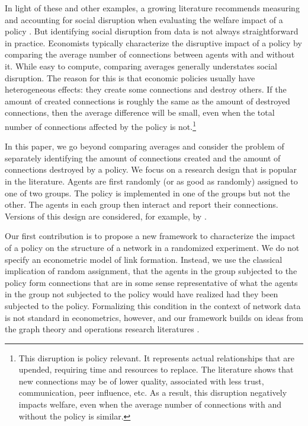 \documentclass[12pt]{article}
\theoremstyle{definition}
\begin{document}
In light of these and other examples, a growing literature recommends measuring and accounting for social disruption when evaluating the welfare impact of a policy \citep[see, for instance,][]{banerjee2021changes,jackson2021inequality}. But identifying social disruption from data is not always straightforward in practice. Economists typically characterize the disruptive impact of a policy by comparing the average number of connections between agents with and without it. While easy to compute, comparing averages generally understates social disruption. The reason for this is that economic policies usually have heterogeneous effects: they create some connections and destroy others. If the amount of created connections is roughly the same as the amount of destroyed connections, then the average difference will be small, even when the total number of connections affected by the policy is not.\footnote{This disruption is policy relevant. It represents actual relationships that are upended, requiring time and resources to replace. The literature shows that new connections may be of lower quality, associated with less trust, communication, peer influence, etc. As a result, this disruption negatively impacts welfare, even when the average number of connections with and without the policy is similar.}  


In this paper, we go beyond comparing averages and consider the problem of separately identifying the amount of connections created and the amount of connections destroyed by a policy. We focus on a research design that is popular in the literature. Agents are first randomly (or as good as randomly) assigned to one of two groups. The policy is implemented in one of the groups but not the other. The agents in each group then interact and report their connections. Versions of this design are considered, for example, by \cite{carrell2013natural,feigenberg2013economic,cai2015social,bajari2021multiple,banerjee2021changes,comola2021treatment,hess2021development,johari2022experimental}.  

Our first contribution is to propose a new framework to characterize the impact of a policy on the structure of a network in a randomized experiment. We do not specify an econometric model of link formation. Instead, we use the classical implication of random assignment, that the agents in the group subjected to the policy form connections that are in some sense representative of what the agents in the group not subjected to the policy would have realized had they been subjected to the policy. Formalizing this condition in the context of network data is not standard in econometrics, however, and our framework builds on ideas from the graph theory and operations research literatures \cite[see, generally,][]{lovasz2012large,cela2013quadratic}.   
\end{document}
